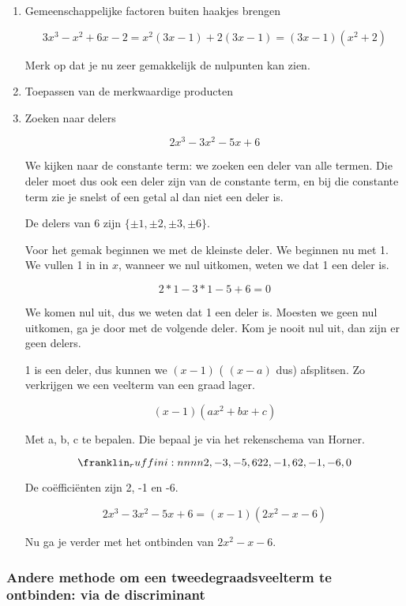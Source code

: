 \begin{enumerate}
	\item Gemeenschappelijke factoren buiten haakjes brengen
	
	\[ 3 x^3 - x^2 + 6x - 2 = x^2(3x - 1) + 2(3x - 1) = (3x-1)(x^2 + 2) \]
	
	Merk op dat je nu zeer gemakkelijk de nulpunten kan zien.
	
	\item Toepassen van de merkwaardige producten
	
	\item Zoeken naar delers
	
	\[ 2x^3 - 3x^2 - 5x + 6 \]
	
	We kijken naar de constante term: we zoeken een deler van alle termen. Die deler moet dus ook een deler zijn van de constante term, en bij die constante term zie je snelst of een getal al dan niet een deler is.
	
	De delers van 6 zijn \( \lbrace \pm 1, \pm 2, \pm 3, \pm 6 \rbrace  \).
	
	Voor het gemak beginnen we met de kleinste deler. We beginnen nu met 1. We vullen 1 in in \(x\), wanneer we nul uitkomen, weten we dat 1 een deler is.
	
	\[ 2 * 1 - 3 * 1 - 5 + 6 = 0 \]
	
	We komen nul uit, dus we weten dat 1 een deler is. Moesten we geen nul uitkomen, ga je door met de volgende deler. Kom je nooit nul uit, dan zijn er geen delers.
	
	1 is een deler, dus kunnen we \( (x - 1) \) ( \((x-a)\) dus) afsplitsen. Zo verkrijgen we een veelterm van een graad lager.
	
	\[ (x-1)(a x^2 + bx + c) \]
	
	Met a, b, c te bepalen. Die bepaal je via het rekenschema van Horner.
	
	\[ \horner{2,-3,-5,6}{2}{2,-1,6}{2,-1,-6,0} \]
	
	De coëfficiënten zijn 2, -1 en -6.
	
	\[ 2x^3 - 3x^2 - 5x + 6 = (x-1)(2x^2 - x - 6)  \]
	
	Nu ga je verder met het ontbinden van \(2x^2 - x - 6\).
	
\end{enumerate}

\subsubsection{Andere methode om een tweedegraadsveelterm te ontbinden: via de discriminant}


